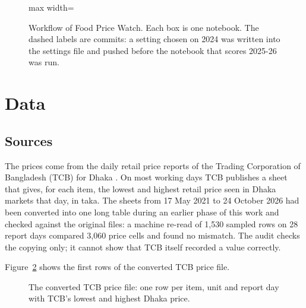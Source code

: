 \begin{figure}[H]
\begin{adjustbox}{max width=\linewidth}
\end{adjustbox}
\caption[Workflow of Food Price Watch]{Workflow of Food Price Watch. Each box is one notebook. The dashed labels are commits: a setting chosen on 2024 was written into the settings file and pushed before the notebook that scores 2025-26 was run.}
\label{fig:workflow}
\end{figure}

\section{Data}\label{sec:data}

\subsection{Sources}
The prices come from the daily retail price reports of the Trading Corporation of Bangladesh (TCB) for Dhaka \cite{tcb}. On most working days TCB publishes a sheet that gives, for each item, the lowest and highest retail price seen in Dhaka markets that day, in taka. The sheets from 17 May 2021 to 24 October 2026 had been converted into one long table during an earlier phase of this work and checked against the original files: a machine re-read of 1,530 sampled rows on 28 report days compared 3,060 price cells and found no mismatch. The audit checks the copying only; it cannot show that TCB itself recorded a value correctly.

Figure~\ref{fig:dataraw} shows the first rows of the converted TCB price file.

\begin{figure}[H]
\centering
{}
\caption[The converted TCB price file]{The converted TCB price file: one row per item, unit and report day with TCB's lowest and highest Dhaka price.}
\label{fig:dataraw}
\end{figure}

